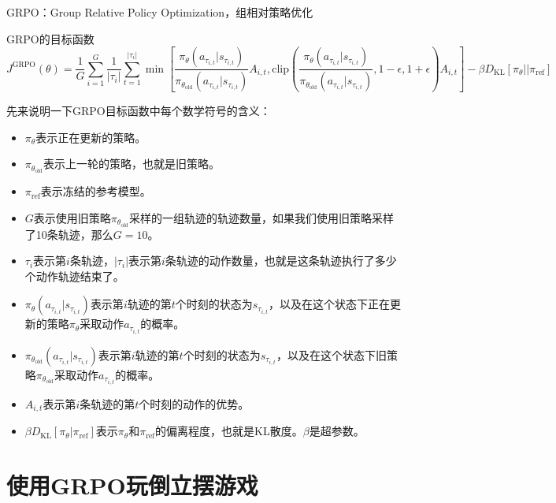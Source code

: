 \documentclass[lang=cn,newtx,10pt,scheme=chinese]{elegantbook}
\begin{document}
\begin{marker}
GRPO：Group Relative Policy Optimization，组相对策略优化
\end{marker}

\begin{theorem}{GRPO的目标函数}{}
\begin{equation}
J^{\text{GRPO}}(\theta)=\frac{1}{G}\displaystyle\sum_{i=1}^G \frac{1}{|\tau_{i}|}\displaystyle\sum_{t=1}^{|\tau_{i}|}\min\left[ \frac{\pi_{\theta}(a_{\tau_{i,t}}|s_{\tau_{i,t}})}{\pi_{\theta_{\text{old}}}(a_{\tau_{i,t}}|s_{\tau_{i,t}})}A_{i,t},\text{clip}\left( \frac{\pi_{\theta}(a_{\tau_{i,t}}|s_{\tau_{i,t}})}{\pi_{\theta_{\text{old}}}(a_{\tau_{i,t}}|s_{\tau_{i,t}})},1-\epsilon,1+\epsilon \right)A_{i,t}  \right]-\beta D_{\text{KL}}\left[ \pi_{\theta}||\pi_{\text{ref}} \right]
\end{equation}
\end{theorem}

先来说明一下GRPO目标函数中每个数学符号的含义：

\begin{itemize}
    \item $\pi_\theta$表示正在更新的策略。
    \item $\pi_{\theta_\text{old}}$表示上一轮的策略，也就是旧策略。
    \item $\pi_\text{ref}$表示冻结的参考模型。
    \item $G$表示使用旧策略$\pi_{\theta_\text{old}}$采样的一组轨迹的轨迹数量，如果我们使用旧策略采样了10条轨迹，那么$G=10$。
    \item $\tau_i$表示第$i$条轨迹，$|\tau_i|$表示第$i$条轨迹的动作数量，也就是这条轨迹执行了多少个动作轨迹结束了。
    \item $\pi_{\theta}(a_{\tau_{i,t}}|s_{\tau_{i,t}})$表示第$i$轨迹的第$t$个时刻的状态为$s_{\tau_{i,t}}$，以及在这个状态下正在更新的策略$\pi_\theta$采取动作$a_{\tau_{i,t}}$的概率。
    \item $\pi_{\theta_{\text{old}}}(a_{\tau_{i,t}}|s_{\tau_{i,t}})$表示第$i$轨迹的第$t$个时刻的状态为$s_{\tau_{i,t}}$，以及在这个状态下旧策略$\pi_{\theta_\text{old}}$采取动作$a_{\tau_{i,t}}$的概率。
    \item $A_{i,t}$表示第$i$条轨迹的第$t$个时刻的动作的优势。
    \item $\beta D_\text{KL}[\pi_\theta|\pi_\text{ref}]$表示$\pi_\theta$和$\pi_\text{ref}$的偏离程度，也就是KL散度。$\beta$是超参数。
\end{itemize}

\section{使用GRPO玩倒立摆游戏}
\end{document}
